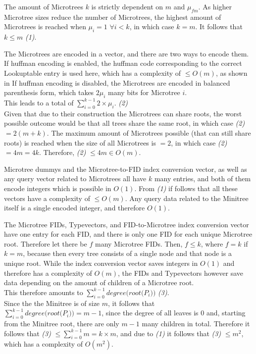 \documentclass{article}
\begin{document}
The amount of Microtrees $k$ is strictly dependent on $m$ and $\mu_{fm}$. As higher Microtree sizes reduce the number of Microtrees, the highest amount of Microtrees is reached when $\mu_{i} = 1$ $\forall i < k$, in which case $k = m$. It follows that $k \leq m$ \textit{(1)}.

The Microtrees are encoded in a vector, and there are two ways to encode them. If huffman encoding is enabled, the huffman code corresponding to the correct Lookuptable entry is used here, which has a complexity of $\leq O(m)$, as shown in \cite{universalSuccinct} %
If huffman encoding is disabled, the Microtrees are encoded in balanced parenthesis form, which takes $2\mu_{i}$ many bits for Microtree $i$.\\
This leads to a total of $\displaystyle\sum_{i=0}^{k-1} 2 \times \mu_{i}$. \textit{(2)}\\
Given that due to their construction the Microtrees can share roots, the worst possible outcome would be that all trees share the same root, in which case \textit{(2)} $= 2(m + k)$. The maximum amount of Microtrees possible (that can still share roots) is reached when the size of all Microtrees is $= 2$, in which case \textit{(2)} $= 4m = 4k$. Therefore, \textit{(2)} $\leq 4m \in O(m)$.

Microtree dummys and the Microtree-to-FID index conversion vector, as well as any query vector related to Microtrees all have $k$ many entries, and both of them encode integers which is possible in $O(1)$. From \textit{(1)} if follows that all these vectors have a complexity of $\leq O(m)$. Any query data related to the Minitree itself is a single encoded integer, and therefore $O(1)$.

The Microtree FIDs, Typevectors, and FID-to-Microtree index conversion vector have one entry for each FID, and there is only one FID for each unique Microtree root. Therefore let there be $f$ many Microtree FIDs. Then, $f \leq k$, where $f = k$ if $k = m$, because then every tree consists of a single node and that node is a unique root.
While the index conversion vector saves integers in $O(1)$ and therefore has a complexity of $O(m)$, the FIDs and Typevectors however save data depending on the amount of children of a Microtree root.\\
This therefore amounts to $\displaystyle\sum_{i=0}^{k-1} \textit{degree(root($P_{i}$))}$ \textit{(3)}.\\
Since the the Minitree is of size $m$, it follows that $\sum_{i=0}^{k-1} \textit{degree(root($P_{i}$))} = m-1$, since the degree of all leaves is $0$ and, starting from the Minitree root, there are only $m-1$ many children in total.
Therefore it follows that \textit{(3)} $\leq \sum_{i=0}^{k-1} m = k \times m$, and due to \textit{(1)} it follows that \textit{(3)} $\leq m^{2}$, which has a complexity of $O(m^{2})$.
\end{document}

